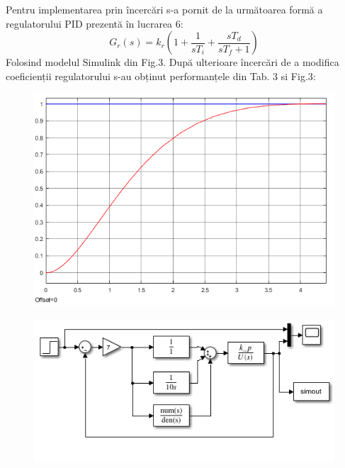 \documentclass[11pt]{article}
\newcommand{\EqRow}{\vspace{1.5mm}}
\begin{document}
Pentru implementarea prin încercări s-a pornit de la următoarea formă a regulatorului PID prezentă în lucrarea 6:
\begin{equation} 
G_r(s)=k_r(1+\frac{1}{sT_i}+\frac{sT_d}{sT_f+1})
\end{equation}
Folosind modelul Simulink din Fig.3.
După ulterioare încercări de a modifica coeficienții regulatorului s-au obținut performanțele din Tab. 3 si Fig.3:
\EqRow
\begin{figure}[H]
	\centering
	\begin{minipage}{.4\textwidth}
		\centering
		\includegraphics[width=1\linewidth]{incercari.png}
		\label{fig:test2}
	\end{minipage}
	\begin{minipage}{.5\textwidth}
		\centering
		\includegraphics[width=1\linewidth]{sim_incercari.png}
		\label{fig:test2}
	\end{minipage}
\end{figure}
\end{document}

